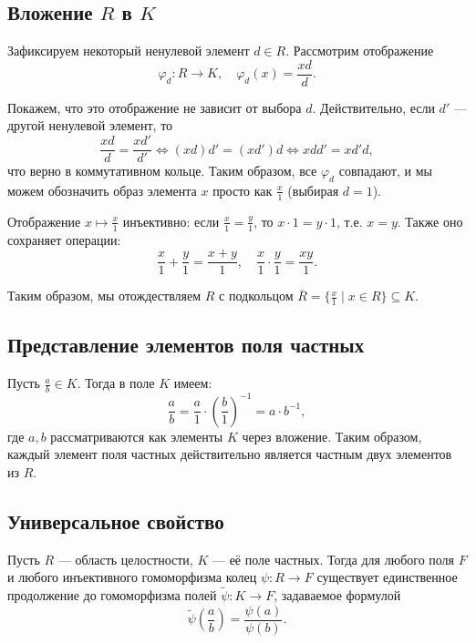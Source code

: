\documentclass[a4paper,12pt]{article}
\theoremstyle{definition}
\theoremstyle{plain}
\theoremstyle{remark}
\begin{document}
	\subsection{Вложение \( R \) в \( K \)}
	
	Зафиксируем некоторый ненулевой элемент \( d \in R \). Рассмотрим отображение
	\[
	\varphi_d: R \to K, \quad \varphi_d(x) = \frac{xd}{d}.
	\]
	
	Покажем, что это отображение не зависит от выбора \( d \). Действительно, если \( d' \) — другой ненулевой элемент, то
	\[
	\frac{xd}{d} = \frac{xd'}{d'} \iff (xd)d' = (xd')d \iff x d d' = x d' d,
	\]
	что верно в коммутативном кольце. Таким образом, все \( \varphi_d \) совпадают, и мы можем обозначить образ элемента \( x \) просто как \( \frac{x}{1} \) (выбирая \( d = 1 \)).
	
	Отображение \( x \mapsto \frac{x}{1} \) инъективно: если \( \frac{x}{1} = \frac{y}{1} \), то \( x \cdot 1 = y \cdot 1 \), т.е. \( x = y \). Также оно сохраняет операции:
	\[
	\frac{x}{1} + \frac{y}{1} = \frac{x+y}{1}, \quad \frac{x}{1} \cdot \frac{y}{1} = \frac{xy}{1}.
	\]
	
	Таким образом, мы отождествляем \( R \) с подкольцом \( \overline{R} = \{ \frac{x}{1} \mid x \in R \} \subseteq K \).
	
	\subsection{Представление элементов поля частных}
	
	Пусть \( \frac{a}{b} \in K \). Тогда в поле \( K \) имеем:
	\[
	\frac{a}{b} = \frac{a}{1} \cdot \left( \frac{b}{1} \right)^{-1} = a \cdot b^{-1},
	\]
	где \( a, b \) рассматриваются как элементы \( K \) через вложение. Таким образом, каждый элемент поля частных действительно является частным двух элементов из \( R \).
	
	\subsection{Универсальное свойство}
	
	\begin{tcolorbox}[colback=yellow!5, colframe=orange!50!black, title=Теорема (Универсальное свойство)]
		Пусть \( R \) — область целостности, \( K \) — её поле частных. Тогда для любого поля \( F \) и любого инъективного гомоморфизма колец \( \psi: R \to F \) существует единственное продолжение до гомоморфизма полей \( \tilde{\psi}: K \to F \), задаваемое формулой
		\[
		\tilde{\psi}\left( \frac{a}{b} \right) = \frac{\psi(a)}{\psi(b)}.
		\]
	\end{tcolorbox}
	
\end{document}
